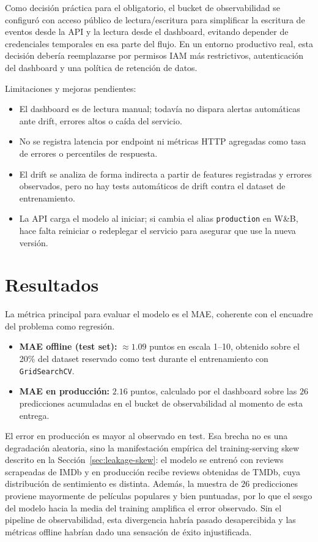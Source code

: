 \documentclass[letterpaper,12pt]{article}
\begin{document}
Como decisión práctica para el obligatorio, el bucket de observabilidad se configuró con acceso público de lectura/escritura para simplificar la escritura de eventos desde la API y la lectura desde el dashboard, evitando depender de credenciales temporales en esa parte del flujo. En un entorno productivo real, esta decisión debería reemplazarse por permisos IAM más restrictivos, autenticación del dashboard y una política de retención de datos.

Limitaciones y mejoras pendientes:

\begin{itemize}
    \item El dashboard es de lectura manual; todavía no dispara alertas automáticas ante drift, errores altos o caída del servicio.
    \item No se registra latencia por endpoint ni métricas HTTP agregadas como tasa de errores o percentiles de respuesta.
    \item El drift se analiza de forma indirecta a partir de features registradas y errores observados, pero no hay tests automáticos de drift contra el dataset de entrenamiento.
    \item La API carga el modelo al iniciar; si cambia el alias \texttt{production} en W\&B, hace falta reiniciar o redeplegar el servicio para asegurar que use la nueva versión.
\end{itemize}

\newpage
\section{Resultados}
\label{sec:resultados}

La métrica principal para evaluar el modelo es el MAE, coherente con el encuadre del problema como regresión.

\begin{itemize}
    \item \textbf{MAE offline (test set):} $\approx 1.09$ puntos en escala 1--10, obtenido sobre el 20\% del dataset reservado como test durante el entrenamiento con \texttt{GridSearchCV}.
    \item \textbf{MAE en producción:} $2.16$ puntos, calculado por el dashboard sobre las $26$ predicciones acumuladas en el bucket de observabilidad al momento de esta entrega.
\end{itemize}

El error en producción es mayor al observado en test. Esa brecha no es una degradación aleatoria, sino la manifestación empírica del training-serving skew descrito en la Sección~\ref{sec:leakage-skew}: el modelo se entrenó con reviews scrapeadas de IMDb y en producción recibe reviews obtenidas de TMDb, cuya distribución de sentimiento es distinta. Además, la muestra de $26$ predicciones proviene mayormente de películas populares y bien puntuadas, por lo que el sesgo del modelo hacia la media del training amplifica el error observado. Sin el pipeline de observabilidad, esta divergencia habría pasado desapercibida y las métricas offline habrían dado una sensación de éxito injustificada.
\end{document}
